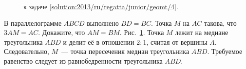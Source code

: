 \ifsolution
\begin{figure}\centering
    \caption{к задаче \ref{solution:2013/ru/regatta/junior/geomt/4}.}
    \label{fig:solution:2013/ru/regatta/junior/geomt/4}
\end{figure}
\fi %

\problem
В параллелограмме $ABCD$ выполнено $BD = BC$.
Точка $M$ на $AC$ такова, что $3 AM = AC$.
Докажите, что $AM = BM$.
\solution
\label{solution:2013/ru/regatta/junior/geomt/4}%
Рис.~\ref{fig:solution:2013/ru/regatta/junior/geomt/4}.
Точка $M$ лежит на медиане треугольника $ABD$ и делит её в отношении $2 : 1$,
считая от вершины $A$.
Следовательно, $M$~--- точка пересечения медиан треугольника $ABD$.
Требуемое равенство следует из равнобедренности треугольника $ABD$.
\endproblem
